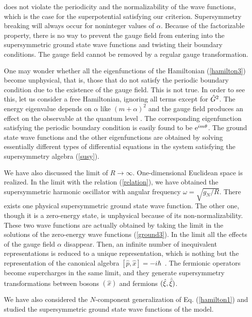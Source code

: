 \documentclass[a4paper,12pt]{article}
\begin{document}
{does not violate the periodicity and the 
normalizability of the wave functions, which is the case 
for the superpotential satisfying our criterion. 
Supersymmetry breaking will
always occur for noninteger values of $\alpha$. 
Because of the factorizable property, there is no way to prevent 
the gauge field from entering into the supersymmetric ground state wave 
functions and twisting their boundary conditions. 
The gauge field cannot be removed by a regular gauge transformation.
\par
One may wonder whether all the eigenfunctions of the 
Hamiltonian (\ref{hamilton3}) become unphysical, that is, those that do not
satisfy the periodic boundary condition due to the existence of the 
gauge field. This is not true. In order to see this, 
let us consider a free Hamiltonian, ignoring all terms except for 
$\hat G^2$. The energy eigenvalue depends on $\alpha$ like $(m+\alpha)^2$ and
the gauge field produces an effect on the observable at 
the quantum level \cite{tanimura}. 
The corresponding eigenfunction satisfying the periodic boundary condition 
is easily found to be ${\rm e}^{im\theta}$. 
The ground state wave functions and the other eigenfunctions 
are obtained by solving
essentially different types of differential equations in 
the system satisfying the supersymmetry algebra (\ref{susy}).
\par
We have also discussed the limit of $R\rightarrow \infty$. 
One-dimensional Euclidean space is realized.
In the limit with the relation (\ref{relation}), we have obtained 
the supersymmetric 
harmonic oscillator with angular frequency $\omega=\sqrt{g_N/R}$. 
There exists one physical supersymmetric ground state wave function. 
The other one, though it is a zero-energy state, is unphysical because of 
its non-normalizability. These two wave functions are actually 
obtained by taking the limit in the solutions of the zero-energy wave 
functions (\ref{ground3}).
In the limit all the effects of the gauge field $\alpha$ 
disappear. Then, an infinite number of inequivalent representations 
is reduced to a unique representation, which is nothing but the 
representation of the canonical algebra $[{\hat p}, {\hat x}]=-i\hbar$~. 
The fermionic operators become supercharges in the same limit, and they
generate supersymmetry transformations between 
bosons $({\hat x})$ and fermions $(\hat\xi, \hat{\bar\xi})$.
\par
We have also considered the $N$-component generalization 
of Eq. (\ref{hamilton1})
and studied the supersymmetric ground state wave functions of the model.
}
\end{document}
